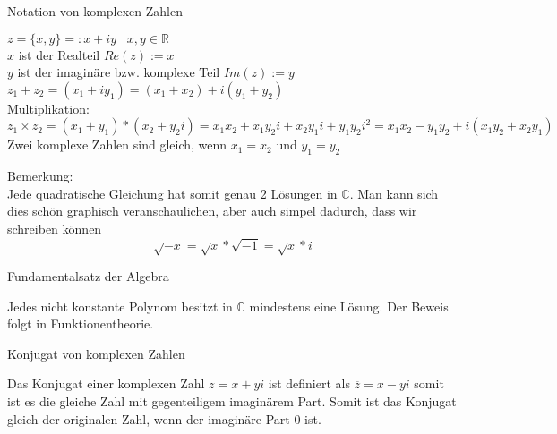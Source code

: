 \documentclass[headsepline,12pt,a4paper]{scrartcl}
\begin{document}
\newpage

\begin{center}
\item[Notation von komplexen Zahlen]
\end{center}
\item $z=\{x,y\} =: x+iy  \; \; \; x,y \in \mathbb{R} $ \\
$x$ ist der Realteil $Re(z):= x$ \\
$y$ ist der imaginäre bzw. komplexe Teil $Im(z):= y$ \\
$z_1+z_2 = (x_1+iy_1) = (x_1+x_2) + i(y_1+y_2) $ \\
Multiplikation:
$$ z_1\times z_2 = (x_1+y_1)*(x_2+y_2i) = x_1 x_2+x_1 y_2i+x_2 y_1i + y_1y_2 i^2 = x_1x_2 - y_1y_2 + i(x_1y_2+x_2y_1) $$
Zwei komplexe Zahlen sind gleich, wenn $x_1=x_2 $ und $y_1 = y_2 $ 

\item Bemerkung:\\
Jede quadratische Gleichung hat somit genau 2 Lösungen in $\mathbb{C}$. Man kann sich dies schön graphisch veranschaulichen, aber auch simpel dadurch, dass wir schreiben können $$ \sqrt{-x} = \sqrt{x} * \sqrt{-1} = \sqrt{x} * i $$

\begin{center}
\item[Fundamentalsatz der Algebra]
\end{center}
\item Jedes nicht konstante Polynom besitzt in $\mathbb{C}$ mindestens eine Lösung. Der Beweis folgt in Funktionentheorie.  \\

\begin{center}
\item[Konjugat von komplexen Zahlen]
\end{center}
\item Das Konjugat einer komplexen Zahl $z = x + yi$ ist definiert als $\overline{z} = x-yi$ somit ist es die gleiche Zahl mit gegenteiligem imaginärem Part. Somit ist das Konjugat gleich der originalen Zahl, wenn der imaginäre Part 0 ist.\\

\newpage
\end{document}
